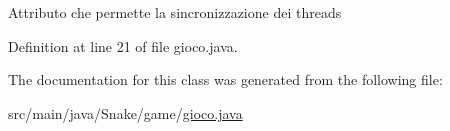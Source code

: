 Attributo che permette la sincronizzazione dei threads 

Definition at line 21 of file gioco.\+java.



The documentation for this class was generated from the following file\+:\begin{DoxyCompactItemize}
\item 
src/main/java/\+Snake/game/\mbox{\hyperlink{gioco_8java}{gioco.\+java}}\end{DoxyCompactItemize}
